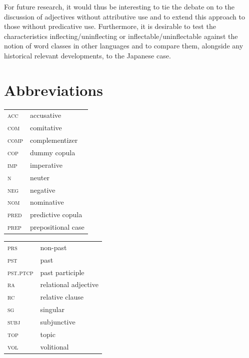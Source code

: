 \documentclass[output=paper,colorlinks,citecolor=brown]{langscibook}
\begin{document}
For future research, it would thus be interesting to tie the debate on  to the discussion of adjectives without attributive use and to extend this approach to those without predicative use. Furthermore, it is desirable to test the characteristics inflecting/uninflecting or inflectable/uninflectable against the notion of word classes in other languages and to compare them, alongside any historical relevant developments, to the Japanese case.
 
 
\section*{Abbreviations}

\begin{tabularx}{.45\textwidth}{lQ}
\textsc{acc} & accusative \\
\textsc{com} & comitative \\
\textsc{comp} & complementizer \\
\textsc{cop} & dummy copula \\
\textsc{imp} & imperative \\
\textsc{n} & neuter \\
\textsc{neg} & negative \\
\textsc{nom} & nominative \\
\textsc{pred} & predictive copula \\
\textsc{prep} & prepositional case
\end{tabularx}
\begin{tabularx}{.45\textwidth}{lQ}
\textsc{prs} & non-past \\
\textsc{pst} & past \\
\textsc{pst.ptcp} & past participle \\
\textsc{ra} & relational adjective \\
\textsc{rc} & relative clause \\
\textsc{sg} & singular \\
\textsc{subj} & subjunctive \\
\textsc{top} & topic \\
\textsc{vol} & volitional
\end{tabularx}




{\sloppy\printbibliography[heading=subbibliography,notkeyword=this]}
\end{document}
